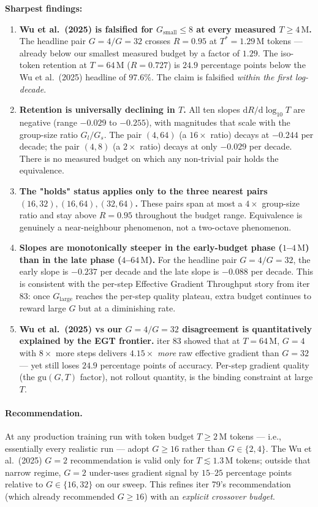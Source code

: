 \noindent
\textbf{Sharpest findings:}
\begin{enumerate}
\item \textbf{Wu et al.\ (2025) is falsified for $G_{\mathrm{small}} \le 8$
at every measured $T \ge 4\,\mathrm{M}$.}  The headline pair
$G{=}4/G{=}32$ crosses $R{=}0.95$ at $T^* = 1.29\,\mathrm{M}$ tokens
--- already below our smallest measured budget by a factor of $1.29$.
The iso-token retention at $T{=}64\,\mathrm{M}$ ($R{=}0.727$) is
$24.9$ percentage points below the Wu et al.\ (2025) headline of
$97.6\%$.  The claim is falsified \emph{within the first log-decade}.
\item \textbf{Retention is universally declining in $T$.}  All ten
slopes $\mathrm{d}R/\mathrm{d}\log_{10}T$ are negative
(range $-0.029$ to $-0.255$), with magnitudes that scale with the
group-size ratio $G_l/G_s$.  The pair $(4, 64)$ (a $16{\times}$
ratio) decays at $-0.244$ per decade; the pair $(4, 8)$ (a $2{\times}$
ratio) decays at only $-0.029$ per decade.  There is no measured budget
on which any non-trivial pair holds the equivalence.
\item \textbf{The "holds" status applies only to the three nearest pairs
$(16,32), (16,64), (32,64)$.}  These pairs span at most a $4{\times}$
group-size ratio and stay above $R{=}0.95$ throughout the budget
range.  Equivalence is genuinely a near-neighbour phenomenon, not a
two-octave phenomenon.
\item \textbf{Slopes are monotonically steeper in the early-budget
phase ($1$--$4\,\mathrm{M}$) than in the late phase ($4$--$64\,\mathrm{M}$).}
For the headline pair $G{=}4/G{=}32$, the early slope is $-0.237$ per
decade and the late slope is $-0.088$ per decade.  This is consistent
with the per-step Effective Gradient Throughput story from iter 83:
once $G_{\mathrm{large}}$ reaches the per-step quality plateau, extra
budget continues to reward large $G$ but at a diminishing rate.
\item \textbf{Wu et al.\ (2025) vs our $G{=}4/G{=}32$ disagreement is
quantitatively explained by the EGT frontier.}  iter 83 showed that at
$T{=}64\,\mathrm{M}$, $G{=}4$ with $8{\times}$ more steps delivers
$4.15{\times}$ \emph{more} raw effective gradient than $G{=}32$ ---
yet still loses $24.9$ percentage points of accuracy.  Per-step
gradient quality (the $\mathrm{gu}(G, T)$ factor), not rollout quantity,
is the binding constraint at large $T$.
\end{enumerate}

\paragraph{Recommendation.}
At any production training run with token budget $T \ge 2\,\mathrm{M}$
tokens --- i.e., essentially every realistic run --- adopt
$G \ge 16$ rather than $G \in \{2, 4\}$.  The Wu et al.\ (2025) $G{=}2$
recommendation is valid only for $T \lesssim 1.3\,\mathrm{M}$ tokens;
outside that narrow regime, $G{=}2$ under-uses gradient signal by
$15$--$25$ percentage points relative to $G \in \{16, 32\}$ on our
sweep.  This refines iter 79's recommendation (which already
recommended $G \ge 16$) with an \emph{explicit crossover budget}.

